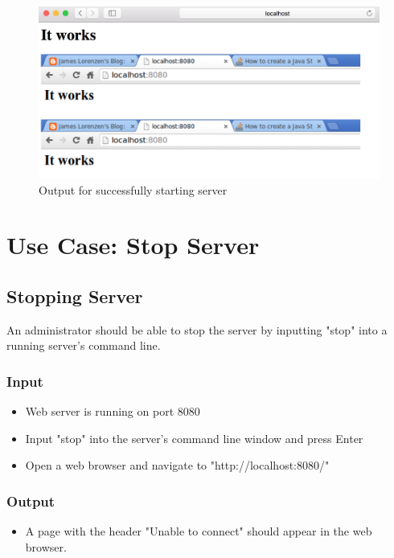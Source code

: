 \documentclass[a4paper, 12pt]{article}
\begin{document}
\begin{figure}[h]
\includegraphics[scale=0.5]{output_clarification/TC1-1.png} 
\caption{Output for successfully starting server}
\label{TC1.1}
\end{figure}

\section{Use Case: Stop Server}

\subsection{Stopping Server}

An administrator should be able to stop the server by inputting "stop" into a running server's command line.

\subsubsection{Input}
\begin{itemize}
\item Web server is running on port 8080
\item Input "stop" into the server's command line window and press Enter
\item Open a web browser and navigate to "http://localhost:8080/"
\end{itemize}

\subsubsection{Output}
\begin{itemize}
\item A page with the header "Unable to connect" should appear in the web browser.
\end{itemize}
\end{document}
